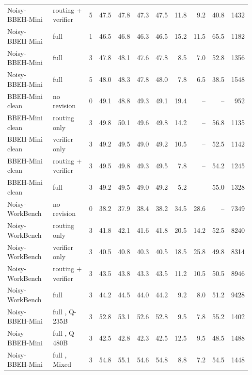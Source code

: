 \begin{longtable}{lllrrrrrrrr}
Noisy-BBEH-Mini & routing + verifier & 5 & 47.5 & 47.8 & 47.3 & 47.5 & 11.8 & 9.2 & 40.8 & 1432 \\
\rowcolor{tracesoft}
Noisy-BBEH-Mini & full \method{} & 1 & 46.5 & 46.8 & 46.3 & 46.5 & 15.2 & 11.5 & 65.5 & 1182 \\
\rowcolor{tracesoft}
Noisy-BBEH-Mini & full \method{} & 3 & 47.8 & 48.1 & 47.6 & 47.8 & 8.5 & 7.0 & 52.8 & 1356 \\
\rowcolor{tracesoft}
Noisy-BBEH-Mini & full \method{} & 5 & 48.0 & 48.3 & 47.8 & 48.0 & 7.8 & 6.5 & 38.5 & 1548 \\
\midrule
BBEH-Mini clean & no revision & 0 & 49.1 & 48.8 & 49.3 & 49.1 & 19.4 & -- & -- & 952 \\
BBEH-Mini clean & routing only & 3 & 49.8 & 50.1 & 49.6 & 49.8 & 14.2 & -- & 56.8 & 1135 \\
BBEH-Mini clean & verifier only & 3 & 49.2 & 49.5 & 49.0 & 49.2 & 10.5 & -- & 52.5 & 1142 \\
BBEH-Mini clean & routing + verifier & 3 & 49.5 & 49.8 & 49.3 & 49.5 & 7.8 & -- & 54.2 & 1245 \\
\rowcolor{tracesoft}
BBEH-Mini clean & full \method{} & 3 & 49.2 & 49.5 & 49.0 & 49.2 & 5.2 & -- & 55.0 & 1328 \\
\midrule
Noisy-WorkBench & no revision & 0 & 38.2 & 37.9 & 38.4 & 38.2 & 34.5 & 28.6 & -- & \textcolor{black}{7349} \\
Noisy-WorkBench & routing only & 3 & 41.8 & 42.1 & 41.6 & 41.8 & 20.5 & 14.2 & 52.5 & \textcolor{black}{8240} \\
Noisy-WorkBench & verifier only & 3 & 40.5 & 40.8 & 40.3 & 40.5 & 18.5 & 25.8 & 49.8 & \textcolor{black}{8314} \\
Noisy-WorkBench & routing + verifier & 3 & 43.5 & 43.8 & 43.3 & 43.5 & 11.2 & 10.5 & 50.5 & \textcolor{black}{8946} \\
\rowcolor{tracesoft}
Noisy-WorkBench & full \method{} & 3 & 44.2 & 44.5 & 44.0 & 44.2 & 9.2 & 8.0 & 51.2 & \textcolor{black}{9428} \\
\midrule
Noisy-BBEH-Mini & full \method{}, Q-235B & 3 & 52.8 & 53.1 & 52.6 & 52.8 & 9.5 & 7.8 & 55.2 & 1402 \\
Noisy-BBEH-Mini & full \method{}, Q-480B & 3 & 42.5 & 42.8 & 42.3 & 42.5 & 12.5 & 9.5 & 48.5 & 1488 \\
Noisy-BBEH-Mini & full \method{}, Mixed & 3 & 54.8 & 55.1 & 54.6 & 54.8 & 8.8 & 7.2 & 54.5 & 1448 \\
\end{longtable}
\endgroup
